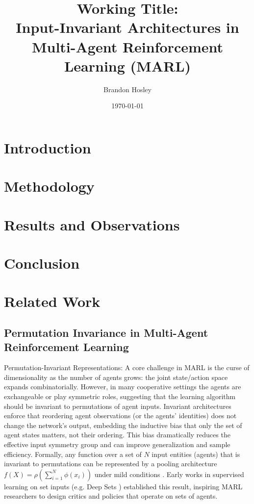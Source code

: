 \documentclass{article}
\title{Working Title: \\
Input-Invariant Architectures in Multi-Agent Reinforcement Learning (MARL)}
\author{Brandon Hosley}
\date{\today}
\begin{document}
\maketitle

\begin{abstract}
\end{abstract}

\section{Introduction}

\section{Methodology}
\label{sec:methodology}
\section{Results and Observations}
\section{Conclusion}





\section{Related Work}

\subsection{Permutation Invariance in Multi-Agent Reinforcement Learning}

Permutation-Invariant Representations: 
A core challenge in MARL is the curse of dimensionality as the number of agents grows: 
the joint state/action space expands combinatorially. 
However, in many cooperative settings the agents are exchangeable or play symmetric roles, 
suggesting that the learning algorithm should be invariant to permutations of agent inputs. 
Invariant architectures enforce that reordering agent observations (or the agents' identities) 
does not change the network's output, embedding the inductive bias 
that only the set of agent states matters, not their ordering. 
This bias dramatically reduces the effective input symmetry group 
and can improve generalization and sample efficiency. 
Formally, any function over a set of $N$ input entities (agents) 
that is invariant to permutations can be represented by a pooling architecture 
$f(X)=\rho(\sum_{i=1}^N \phi(x_i))$ under mild conditions \cite{zaheer2017}. 
Early works in supervised learning on set inputs (e.g. Deep Sets \cite{zaheer2017}) 
established this result, inspiring MARL researchers to design critics and 
policies that operate on sets of agents.
\end{document}

